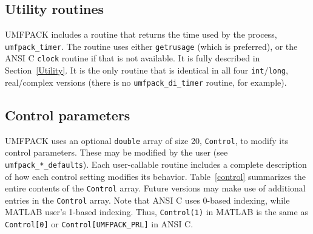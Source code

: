 \subsection{Utility routines}

UMFPACK includes a routine that returns the time used by the process,
{\tt umfpack\_timer}.  The routine uses either {\tt getrusage} (which is
preferred), or the ANSI C {\tt clock} routine if that is not available.
It is fully described in Section~\ref{Utility}.  It is the only routine
that is identical in all four {\tt int}/{\tt long}, real/complex versions
(there is no {\tt umfpack\_di\_timer} routine, for example).

\subsection{Control parameters}
\label{control_param}

UMFPACK uses an optional {\tt double} array of size 20, {\tt Control}, to modify
its control parameters.  These may be modified by the user
(see {\tt umfpack\_*\_defaults}).  Each
user-callable routine includes a complete description of how each control
setting modifies its behavior.  Table~\ref{control} summarizes the entire
contents of the {\tt Control} array.  Future versions may make use of
additional entries in the {\tt Control} array.
Note that ANSI C uses 0-based indexing, while MATLAB user's 1-based
indexing.  Thus, {\tt Control(1)} in MATLAB is the same as
{\tt Control[0]} or {\tt Control[UMFPACK\_PRL]} in ANSI C.

